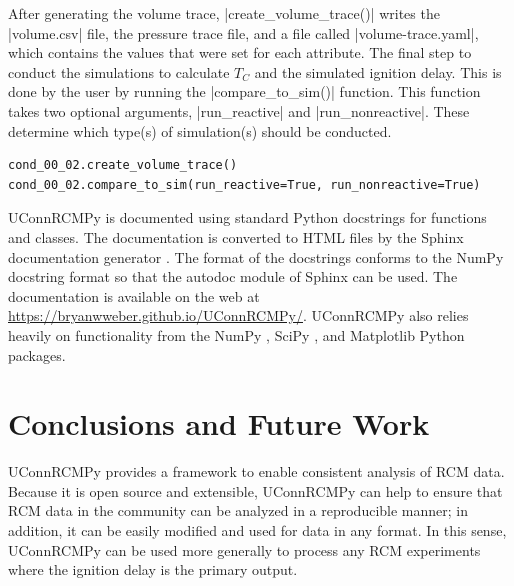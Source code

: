 \documentclass[12pt]{../ussci}
\begin{document}
After generating the volume trace, \python|create_volume_trace()| writes the
\python|volume.csv| file, the pressure trace file, and a file called
\python|volume-trace.yaml|, which contains the values that were set for each
attribute. The final step to conduct the simulations to calculate \(T_C\) and
the simulated ignition delay. This is done by the user by running the
\python|compare_to_sim()| function. This function takes two optional arguments,
\python|run_reactive| and \python|run_nonreactive|. These determine which
type(s) of simulation(s) should be conducted.

\begin{verbatim}
cond_00_02.create_volume_trace()
cond_00_02.compare_to_sim(run_reactive=True, run_nonreactive=True)
\end{verbatim}


UConnRCMPy is documented using standard Python docstrings for functions and
classes. The documentation is converted to HTML files by the Sphinx
documentation generator \autocite{Brandl2016}. The format of the docstrings
conforms to the NumPy docstring format so that the autodoc module of Sphinx can
be used. The documentation is available on the web at
\url{https://bryanwweber.github.io/UConnRCMPy/}. UConnRCMPy also relies heavily
on functionality from the NumPy \autocite{vanderWalt2011}, SciPy
\autocite{Jones2001}, and Matplotlib \autocite{Hunter2007} Python packages.


\section{Conclusions and Future Work}\label{conclusions-and-future-work}

UConnRCMPy provides a framework to enable consistent analysis of RCM
data. Because it is open source and extensible, UConnRCMPy can help to
ensure that RCM data in the community can be analyzed in a reproducible
manner; in addition, it can be easily modified and used for data in any
format. In this sense, UConnRCMPy can be used more generally to process
any RCM experiments where the ignition delay is the primary output.
\end{document}
